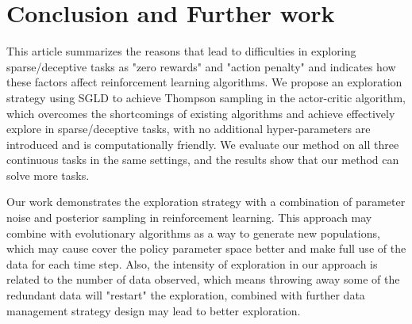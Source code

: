 \section{Conclusion and Further work}
This article summarizes the reasons that lead to difficulties in exploring sparse/deceptive tasks as "zero rewards" and "action penalty" and indicates how these factors affect reinforcement learning algorithms. We propose an exploration strategy using SGLD to achieve Thompson sampling in the actor-critic algorithm, which overcomes the shortcomings of existing algorithms and achieve effectively explore in sparse/deceptive tasks, with no additional hyper-parameters are introduced and is computationally friendly. We evaluate our method on all three continuous tasks in the same settings, and the results show that our method can solve more tasks.

Our work demonstrates the exploration strategy with a combination of parameter noise and posterior sampling in reinforcement learning. This approach may combine with evolutionary algorithms as a way to generate new populations, which may cause cover the policy parameter space better and make full use of the data for each time step. Also, the intensity of exploration in our approach is related to the number of data observed, which means throwing away some of the redundant data will "restart" the exploration, combined with further data management strategy design may lead to better exploration.